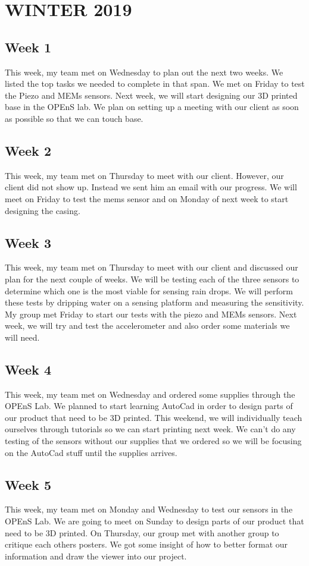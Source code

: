 \documentclass[letterpaper,10pt,draftclsnofoot,onecolumn]{article}
\begin{document}
\section{WINTER 2019}
\subsection{Week 1}
This week, my team met on Wednesday to plan out the next two weeks. We listed the top tasks we needed to complete in that span. We met on Friday to test the Piezo and MEMs sensors. Next week, we will start designing our 3D printed base in the OPEnS lab. We plan on setting up a meeting with our client as soon as possible so that we can touch base.
\subsection{Week 2}
This week, my team met on Thursday to meet with our client. However, our client did not show up. Instead we sent him an email with our progress. We will meet on Friday to test the mems sensor and on Monday of next week to start designing the casing.
\subsection{Week 3}
This week, my team met on Thursday to meet with our client and discussed our plan for the next couple of weeks. We will be testing each of the three sensors to determine which one is the most viable for sensing rain drops. We will perform these tests by dripping water on a sensing platform and measuring the sensitivity. My group met Friday to start our tests with the piezo and MEMs sensors. Next week, we will try and test the accelerometer and also order some materials we will need.
\subsection{Week 4}
This week, my team met on Wednesday and ordered some supplies through the OPEnS Lab. We planned to start learning AutoCad in order to design parts of our product that need to be 3D printed. This weekend, we will individually teach ourselves through tutorials so we can start printing next week. We can't do any testing of the sensors without our supplies that we ordered so we will be focusing on the AutoCad stuff until the supplies arrives. 
\subsection{Week 5}
This week, my team met on Monday and Wednesday to test our sensors in the OPEnS Lab. We are going to meet on Sunday to design parts of our product that need to be 3D printed. On Thursday, our group met with another group to critique each others posters. We got some insight of how to better format our information and draw the viewer into our project. 
\end{document}

